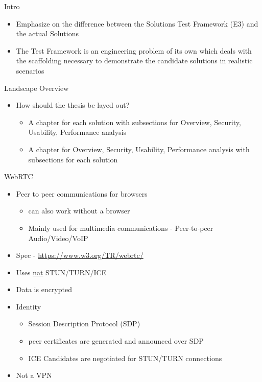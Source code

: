 \begin{frame}{Intro}
\protect\hypertarget{intro}{}
\begin{itemize}
\tightlist
\item
  Emphasize on the difference between the Solutions Test Framework (E3)
  and the actual Solutions
\item
  The Test Framework is an engineering problem of its own which deals
  with the scaffolding necessary to demonstrate the candidate solutions
  in realistic scenarios
\end{itemize}
\end{frame}

\begin{frame}[fragile]{Landscape Overview}
\protect\hypertarget{landscape-overview}{}
\begin{itemize}
\tightlist
\item
  How should the thesis be layed out?

  \begin{itemize}
  \tightlist
  \item
    A chapter for each solution with subsections for Overview, Security,
    Usability, Performance analysis
  \item
    A chapter for Overview, Security, Usability, Performance analysis
    with subsections for each solution
  \end{itemize}
\end{itemize}

\begin{block}{WebRTC}
\protect\hypertarget{webrtc}{}
\begin{itemize}
\tightlist
\item
  Peer to peer communications for browsers

  \begin{itemize}
  \tightlist
  \item
    can also work without a browser
  \item
    Mainly used for multimedia communications - Peer-to-peer
    Audio/Video/VoIP
  \end{itemize}
\item
  Spec -
  \href{https://www.w3.org/TR/webrtc/\#persistent-information-exposed-by-webrtc}{https://www.w3.org/TR/webrtc/}
\item
  Uses \href{notes/0202-nat}{nat} STUN/TURN/ICE
\item
  Data is encrypted
\item
  Identity

  \begin{itemize}
  \tightlist
  \item
    Session Description Protocol (SDP)
  \item
    peer certificates are generated and announced over SDP
  \item
    ICE Candidates are negotiated for STUN/TURN connections
  \end{itemize}
\item
  Not a VPN


\end{itemize}
\end{block}
\end{frame}
